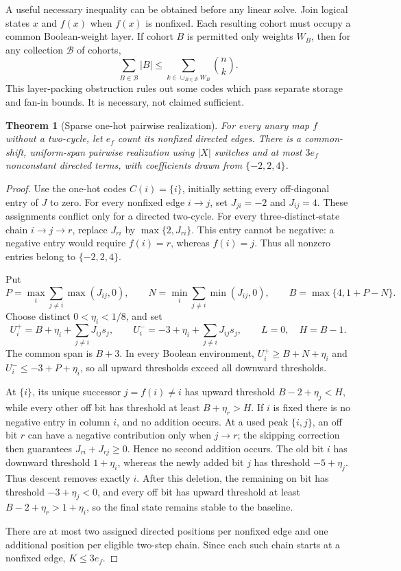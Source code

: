 \documentclass[12pt,letterpaper]{article}
\newtheorem{theorem}{Theorem}[section]
\theoremstyle{definition}\newtheorem{definition}[theorem]{Definition}
\theoremstyle{remark}\newtheorem{remark}[theorem]{Remark}
\begin{document}
A useful necessary inequality can be obtained before any linear solve. Join logical states $x$ and $f(x)$ when $f(x)$ is nonfixed. Each resulting cohort must occupy a common Boolean-weight layer. If cohort $B$ is permitted only weights $W_B$, then for any collection $\mathcal B$ of cohorts,
\begin{equation}\label{eq:cohort}
 \sum_{B\in\mathcal B}|B|\le\sum_{k\in\cup_{B\in\mathcal B}W_B}\binom nk.
\end{equation}
This layer-packing obstruction rules out some codes which pass separate storage and fan-in bounds. It is necessary, not claimed sufficient.

\begin{theorem}[Sparse one-hot pairwise realization]\label{thm:sparse}
For every unary map $f$ without a two-cycle, let $e_f$ count its nonfixed directed edges. There is a common-shift, uniform-span pairwise realization using $|X|$ switches and at most $3e_f$ nonconstant directed terms, with coefficients drawn from $\{-2,2,4\}$.
\end{theorem}
\begin{proof}
Use the one-hot codes $C(i)=\{i\}$, initially setting every off-diagonal entry of $J$ to zero. For every nonfixed edge $i\to j$, set $J_{ji}=-2$ and $J_{ij}=4$. These assignments conflict only for a directed two-cycle. For every three-distinct-state chain $i\to j\to r$, replace $J_{ri}$ by $\max\{2,J_{ri}\}$. This entry cannot be negative: a negative entry would require $f(i)=r$, whereas $f(i)=j$. Thus all nonzero entries belong to $\{-2,2,4\}$.

Put
\[
 P=\max_i\sum_{j\ne i}\max(J_{ij},0),\qquad
 N=\min_i\sum_{j\ne i}\min(J_{ij},0),\qquad
 B=\max\{4,1+P-N\}.
\]
Choose distinct $0<\eta_i<1/8$, and set
\[
 U_i^+=B+\eta_i+\sum_{j\ne i}J_{ij}s_j,\qquad
 U_i^-=-3+\eta_i+\sum_{j\ne i}J_{ij}s_j,
 \qquad L=0,\quad H=B-1.
\]
The common span is $B+3$. In every Boolean environment,
$U_i^+\ge B+N+\eta_i$ and $U_i^-\le-3+P+\eta_i$, so all upward thresholds exceed all downward thresholds.

At $\{i\}$, its unique successor $j=f(i)\ne i$ has upward threshold $B-2+\eta_j<H$, while every other off bit has threshold at least $B+\eta_r>H$. If $i$ is fixed there is no negative entry in column $i$, and no addition occurs. At a used peak $\{i,j\}$, an off bit $r$ can have a negative contribution only when $j\to r$; the skipping correction then guarantees $J_{ri}+J_{rj}\ge0$. Hence no second addition occurs. The old bit $i$ has downward threshold $1+\eta_i$, whereas the newly added bit $j$ has threshold $-5+\eta_j$. Thus descent removes exactly $i$. After this deletion, the remaining on bit has threshold $-3+\eta_j<0$, and every off bit has upward threshold at least $B-2+\eta_r>1+\eta_i$, so the final state remains stable to the baseline.

There are at most two assigned directed positions per nonfixed edge and one additional position per eligible two-step chain. Since each such chain starts at a nonfixed edge, $K\le3e_f$.
\end{proof}
\end{document}

